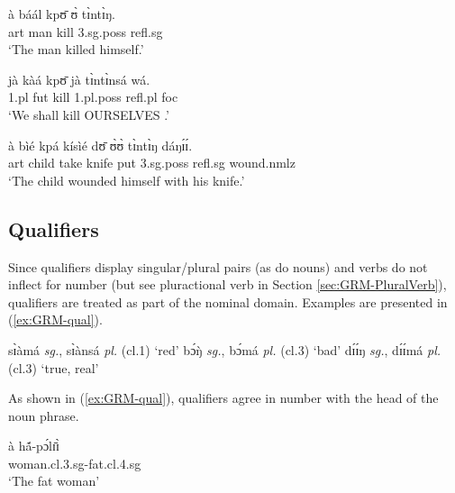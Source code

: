 \begin{exe}
\begin{exe}
\begin{exe}
{\begin{exe}
\begin{exe}
\begin{exe}
\begin{exe}
\begin{exe}
\begin{exe}
\begin{exe}
   
  \z 
 \z



 \ea\label{ex:GRM-reflex}
  
   
\ea\label{ex:vp25.1.}
\gll  à báál kpʊ̄ ʊ̀ tɪ̀ntɪ̀ŋ.\\
   {\sc art} man kill  {\sc 3.sg.poss} {\sc refl.sg}\\
\glt  `The man killed himself.' 

\ex\label{ex:vp25.2.}
\gll jà kàá kpʊ̄ jà tɪ̀ntɪ̀nsá wá.\\
  {\sc 1.pl}  {\sc fut} kill {\sc 1.pl.poss}  {\sc refl.pl} {\sc foc}\\
\glt  `We shall kill OURSELVES  .'

\ex\label{ex:vp25.4.}
\gll à bìé kpá kísìé dʊ̄ ʊ̀ʊ̀ tɪ̀ntɪ̀ŋ dáŋɪ́ɪ́.\\
    {\sc art} child take knife put  {\sc 3.sg.poss}   {\sc
refl.sg} wound.{\sc nmlz}\\
\glt  `The child wounded himself with his knife.' 
  
   
  \z 
 \z




\subsection{Qualifiers}
\label{sec:GRM-qualifier}


Since qualifiers display singular/plural pairs (as  do nouns) and verbs do not 
inflect for number (but see pluractional verb in  Section 
\ref{sec:GRM-PluralVerb}), qualifiers are treated  as part of the nominal domain. 
Examples are 
presented in (\ref{ex:GRM-qual}).


\ea\label{ex:GRM-qual}
 
  \ea\label{ex:GRM-qual-red}
sɪ̀àmá {\it sg.}, sɪ̀ànsá {\it pl.}   {\rm ({\sc cl.}1) `red'}
  \ex\label{ex:GRM-qual-bad}
 bɔ́ŋ̀ {\it sg.}, bɔ́má {\it pl.}   {\rm  ({\sc cl.}3)  `bad'}
  \ex\label{ex:GRM-qual-real}
dɪ́ɪ́ŋ {\it sg.}, dɪ́ɪ́má {\it pl.} {\rm  ({\sc cl.}3) `true, real'}

  
\z 
 \z


As shown in (\ref{ex:GRM-qual}), qualifiers agree in number with the head of the
noun phrase. 

\ea\label{ex:GRM-qual-agree}
 
  \ea\label{ex:GRM-qual-agree-sg}

\gll à  hã́-pɔ́lɪ̄ɪ̀\\
{\art} woman.{\sc cl.3.sg}-fat.{\sc cl.4.sg}\\
\glt `The fat woman' 



\end{exe}
\end{exe}
\end{exe}
\end{exe}
\end{exe}
\end{exe}
\end{exe}}
\end{exe}
\end{exe}
\end{exe}
